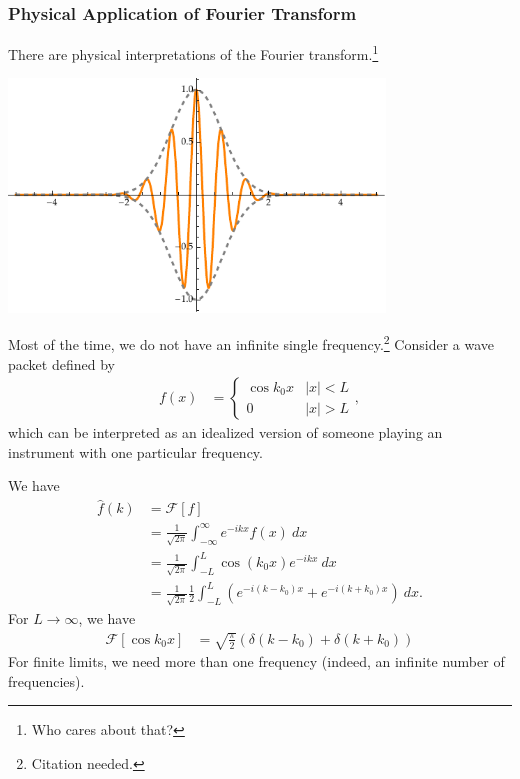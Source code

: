\documentclass[10pt]{mypackage}
\begin{document}
\subsubsection{Physical Application of Fourier Transform}%
There are physical interpretations of the Fourier transform.\footnote{Who cares about that?}
\begin{example}
  \begin{center}
    \includegraphics[width=10cm]{images/fourier_transform_example.pdf}
  \end{center}
  Most of the time, we do not have an infinite single frequency.\footnote{Citation needed.} Consider a wave packet defined by
  \begin{align*}
    f(x) &= \begin{cases}
      \cos k_0 x & |x| < L\\
      0 & |x| > L
    \end{cases},
  \end{align*}
  which can be interpreted as an idealized version of someone playing an instrument with one particular frequency.\newline

  We have
  \begin{align*}
    \widehat{f}(k) &= \mathcal{F}\left[f\right]\\
                   &= \frac{1}{\sqrt{2\pi}}\int_{-\infty}^{\infty} e^{-ikx}f(x)\:dx\\
                   &= \frac{1}{\sqrt{2\pi}}\int_{-L}^{L} \cos\left(k_0x\right)e^{-ikx}\:dx\\
                   &= \frac{1}{\sqrt{2\pi}}\frac{1}{2}\int_{-L}^{L} \left(e^{-i\left(k-k_0\right)x} + e^{-i\left(k + k_0\right)x}\right)\:dx.
  \end{align*}
  For $L\rightarrow\infty$, we have
  \begin{align*}
    \mathcal{F}\left[\cos k_0 x\right] &= \sqrt{\frac{\pi}{2}}\left(\delta\left(k-k_0\right) + \delta\left(k + k_0\right)\right)
  \end{align*}
  For finite limits, we need more than one frequency (indeed, an infinite number of frequencies).\newline


\end{example}
\end{document}

